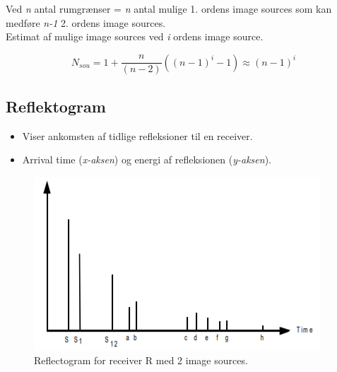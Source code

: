 \noindent Ved \textit{n} antal rumgrænser = \textit{n} antal mulige 1. ordens image sources som kan medføre \textit{n-1} 2. ordens image sources. \\

\noindent Estimat af mulige image sources ved \textit{i} ordens image source. 

\begin{equation}
N_{sou}=1+\dfrac{n}{(n-2)}((n-1)^i -1)\approx (n-1)^i
\end{equation}

\newpage
\subsection{Reflektogram}
\begin{itemize}
	\item Viser ankomsten af tidlige refleksioner til en receiver.
	\item Arrival time (\textit{x-aksen}) og energi af refleksionen (\textit{y-aksen}).
\end{itemize}

\begin{figure} [H]
	\centering
	\includegraphics[width=.75\linewidth]{graphics/19.png}
	\caption{Reflectogram for receiver R med 2 image sources.}
	\label{fig:19}
\end{figure}

